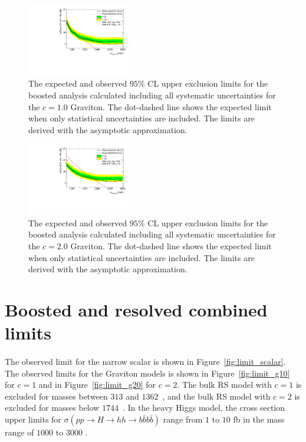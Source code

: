 \begin{figure}
\begin{center}
\includegraphics[width=0.4\textwidth,angle=-90]{figures/boosted/results/limit_boosted_boosted_okt18_g10.pdf}
\caption{The expected and observed $95\%$ CL upper exclusion limits for the boosted analysis calculated including all systematic uncertainties for the $c=1.0$ Graviton. The dot-dashed line shows the expected limit when only statistical uncertainties are included. The limits are derived with the asymptotic approximation.}
\label{fig:limit_boosted_g20}
\end{center}
\end{figure}
\begin{figure}

\begin{center}
\includegraphics[width=0.4\textwidth,angle=-90]{figures/boosted/results/limit_boosted_boosted_okt18_g20.pdf}
\caption{The expected and observed $95\%$ CL upper exclusion limits for the boosted analysis calculated including all systematic uncertainties for the $c=2.0$ Graviton. The dot-dashed line shows the expected limit when only statistical uncertainties are included. The limits are derived with the asymptotic approximation.}
\label{fig:limit_boosted_scalar}
\end{center}
\end{figure}


\section{Boosted and resolved combined limits}
\label{sec:combinedlimits}
\paragraph{}
The observed limit for the narrow scalar is shown in Figure~\ref{fig:limit_scalar}.
The observed limits for the Graviton models is shown in Figure~\ref{fig:limit_g10} for $c = 1$ and in Figure~\ref{fig:limit_g20} for $c = 2$.
The bulk RS model with $c = 1$ is excluded for masses between $313$ and $1362$~\GeV, and the bulk RS model with $c = 2$ is excluded for masses below $1744$~\GeV. 
In the heavy Higgs model, the cross section upper limits for $\sigma(pp \to H \to hh \to b\bar{b}b\bar{b})$ range from $1$ to $10$ fb in the mass range of $1000$ to $3000$ \GeV.

